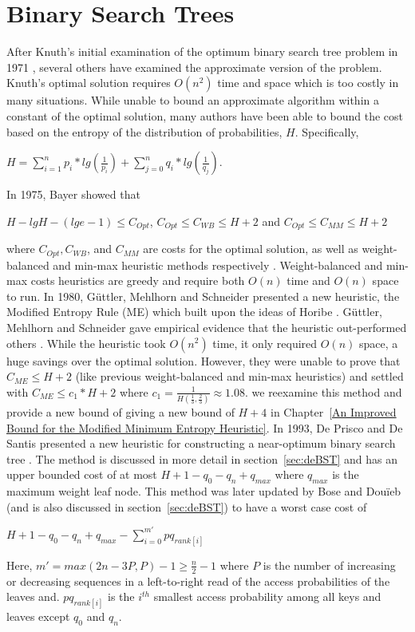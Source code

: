 \documentclass[letterpaper,12pt,titlepage,oneside,final]{book}
\theoremstyle{plain}
\begin{document}
\section{Binary Search Trees}

After Knuth's initial examination of the optimum binary search tree problem in 1971 \cite{knuth1971optimum}, several others have examined the approximate version of the problem. Knuth's optimal solution requires $O(n^2)$ time and space which is too costly in many situations. While unable to bound an approximate algorithm within a constant of the optimal solution, many authors have been able to bound the cost based on the entropy of the distribution of probabilities, $H$. Specifically, 
\begin{center}
$H = \sum_{i=1}^{n} p_i*lg(\frac{1}{p_i}) + \sum_{j=0}^{n} q_i*lg(\frac{1}{q_j})$.
\end{center}
In 1975, Bayer showed that 
\begin{center}
$H-lg H-(lg e-1) \leq C_{Opt}$, $C_{Opt} \leq C_{WB} \leq H + 2$ and $C_{Opt} \leq C_{MM} \leq H + 2$
\end{center}
where $C_{Opt}, C_{WB}$, and $C_{MM}$ are costs for the optimal solution, as well as weight-balanced and min-max heuristic methods respectively \cite{bayer1975improved}. Weight-balanced and min-max costs heuristics are greedy and require both $O(n)$ time and $O(n)$ space to run. In 1980, G{\"u}ttler, Mehlhorn and Schneider presented a new heuristic, the Modified Entropy Rule (ME) \cite{guttler1980binary} which built upon the ideas of Horibe \cite{horibe1977improved}. G{\"u}ttler, Mehlhorn and Schneider gave empirical evidence that the heuristic out-performed others \cite{guttler1980binary}. While the heuristic took $O(n^2)$ time, it only required $O(n)$ space, a huge savings over the optimal solution. However, they were unable to prove that $C_{ME} \leq H+2$ (like previous weight-balanced and min-max heuristics) and settled with $C_{ME} \leq c_1*H+2$ where $c_1=\frac{1}{H(\frac{1}{3}, \frac{2}{3})} \approx 1.08$. we reexamine this method and provide a new bound of giving a new bound of $H+4$ in Chapter~\ref{An Improved Bound for the Modified Minimum Entropy Heuristic}. In 1993, De Prisco and De Santis presented a new heuristic for constructing a near-optimum binary search tree \cite{de1993binary}. The method is discussed in more detail in section~\ref{sec:deBST} and has an upper bounded cost of at most $H+1-q_0-q_n+q_{max}$ where $q_{max}$ is the maximum weight leaf node. This method was later updated by Bose and Dou\"{i}eb (and is also discussed in section~\ref{sec:deBST}) to have a worst case cost of 
\begin{center}
$H + 1 - q_0 - q_n + q_{max} - \sum_{i=0}^{m'} pq_{rank[i]}$
\end{center}
Here, $m'=max({2n-3P,P})-1 \geq \frac{n}{2} - 1$ where $P$ is the number of increasing or decreasing sequences in a left-to-right read of the access probabilities of the leaves and.  $pq_{rank[i]}$ is the $i^{th}$ smallest access probability among all keys and leaves except $q_0$ and $q_n$.
\end{document}
